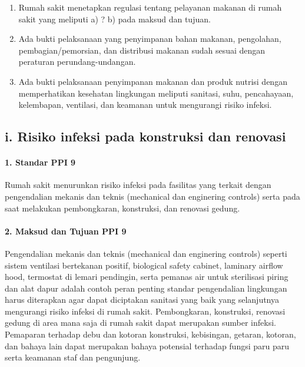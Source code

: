 \documentclass[
]{book}
\providecommand{\tightlist}{%
  \setlength{\itemsep}{0pt}\setlength{\parskip}{0pt}}
\begin{document}
\begin{enumerate}
\def\labelenumi{\alph{enumi}.}
\tightlist
\item
  Rumah sakit menetapkan regulasi tentang pelayanan makanan di rumah sakit yang meliputi a) ? b) pada maksud dan tujuan.
\item
  Ada bukti pelaksanaan yang penyimpanan bahan makanan, pengolahan, pembagian/pemorsian, dan distribusi makanan sudah sesuai dengan peraturan perundang-undangan.
\item
  Ada bukti pelaksanaan penyimpanan makanan dan produk nutrisi dengan memperhatikan kesehatan lingkungan meliputi sanitasi, suhu, pencahayaan, kelembapan, ventilasi, dan keamanan untuk mengurangi risiko infeksi.
\end{enumerate}

\hypertarget{i.-risiko-infeksi-pada-konstruksi-dan-renovasi}{%
\subsection*{i. Risiko infeksi pada konstruksi dan renovasi}\label{i.-risiko-infeksi-pada-konstruksi-dan-renovasi}}

\hypertarget{standar-ppi-9}{%
\paragraph*{1. Standar PPI 9}\label{standar-ppi-9}}

Rumah sakit menurunkan risiko infeksi pada fasilitas yang terkait dengan pengendalian mekanis dan teknis (mechanical dan enginering controls) serta pada saat melakukan pembongkaran, konstruksi, dan renovasi gedung.

\hypertarget{maksud-dan-tujuan-ppi-9}{%
\paragraph*{2. Maksud dan Tujuan PPI 9}\label{maksud-dan-tujuan-ppi-9}}

Pengendalian mekanis dan teknis (mechanical dan enginering controls) seperti sistem ventilasi bertekanan positif, biological safety cabinet, laminary airflow hood, termostat di lemari pendingin, serta pemanas air untuk sterilisasi piring dan alat dapur adalah contoh peran penting standar pengendalian lingkungan harus diterapkan agar dapat diciptakan sanitasi yang baik yang selanjutnya mengurangi risiko infeksi di rumah sakit. Pembongkaran, konstruksi, renovasi gedung di area mana saja di rumah sakit dapat merupakan sumber infeksi. Pemaparan terhadap debu dan kotoran konstruksi, kebisingan, getaran, kotoran, dan bahaya lain dapat merupakan bahaya potensial terhadap fungsi paru paru serta keamanan staf dan pengunjung.
\end{document}
